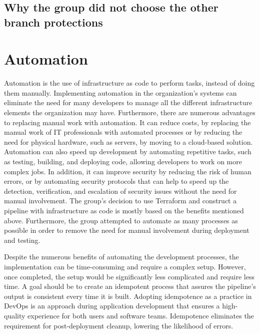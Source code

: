 \subsection{Why the group did not choose the other branch protections}%










\section{Automation}
Automation is the use of \gls{infrastructure as code} to perform tasks, instead of doing them manually. Implementing automation in the organization's systems can eliminate the need for many developers to manage all the different infrastructure elements the organization may have. Furthermore, there are numerous advantages to replacing manual work with automation. It can reduce costs, by replacing the manual work of IT professionals with automated processes or by reducing the need for physical hardware, such as servers, by moving to a cloud-based solution. Automation can also speed up development by automating repetitive tasks, such as testing, building, and deploying code, allowing developers to work on more complex jobs. In addition, it can improve security by reducing the risk of human errors, or by automating security protocols that can help to speed up the detection, verification, and escalation of security issues without the need for manual involvement. The group's decision to use Terraform and construct a pipeline with \gls{infrastructure as code} is mostly based on the benefits mentioned above. Furthermore, the group attempted to automate as many processes as possible in order to remove the need for manual involvement during deployment and testing. \cite{automation} \cite{automationredhat}

Despite the numerous benefits of automating the development processes, the implementation can be time-consuming and require a complex setup. However, once completed, the setup would be significantly less complicated and require less time. A goal should be to create an idempotent process that assures the pipeline's output is consistent every time it is built. Adopting idempotence as a practice in DevOps is an approach during application development that ensures a high-quality experience for both users and software teams. Idempotence eliminates the requirement for post-deployment cleanup, lowering the likelihood of errors. \cite{idempotent}







